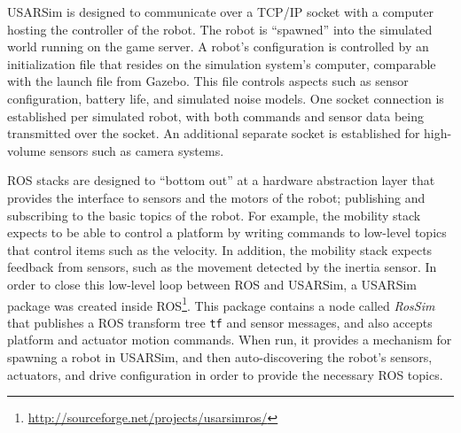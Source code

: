 USARSim is designed to communicate over 
a TCP/IP socket with a computer hosting the controller of the robot. The robot is ``spawned'' into the simulated world running on the game server. 
A robot's configuration is controlled by an initialization file that resides on the simulation system's computer, comparable with the launch file from Gazebo. 
This file controls aspects such as sensor configuration, battery life, and simulated noise models. 
 One socket connection is established per simulated robot, with both commands and sensor data being transmitted over the socket. An additional separate socket is established for high-volume sensors such as camera systems.

ROS stacks are designed to ``bottom out'' at a hardware abstraction layer that provides the interface 
to sensors and the motors of the robot; publishing and subscribing to the basic topics of the robot. 
For example, the mobility stack expects to be able to control a platform by writing commands to low-level topics that control items such as the velocity.
In addition, the mobility stack expects feedback from sensors, such as the movement detected by the inertia sensor. 
In order to close this low-level loop between ROS and USARSim, a USARSim package was created inside ROS\footnote{\url{http://sourceforge.net/projects/usarsimros/}}. This package contains a node called {\it RosSim} that publishes a ROS  transform tree \texttt{tf} and sensor messages, and also accepts platform and actuator motion commands. 
When run, it provides a mechanism for spawning a robot in USARSim, and then auto-discovering the robot's sensors, actuators, and drive configuration in order to provide the necessary ROS topics. 
 

